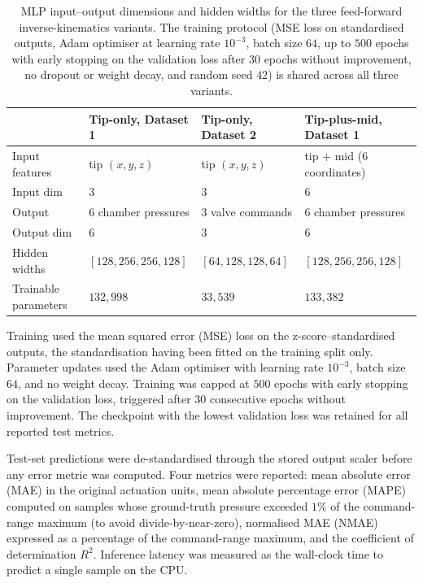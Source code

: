 \begin{table}[ht]
\centering
\caption[MLP configurations for the feed-forward inverse-kinematics variants.]{MLP input--output dimensions and hidden widths for the three feed-forward inverse-kinematics variants. The training protocol (MSE loss on standardised outputs, Adam optimiser at learning rate $10^{-3}$, batch size $64$, up to $500$ epochs with early stopping on the validation loss after $30$ epochs without improvement, no dropout or weight decay, and random seed $42$) is shared across all three variants.}
\label{tab:mlp_config}
\begin{tabularx}{\linewidth}{@{}l X X X@{}}
\toprule
                 & Tip-only, Dataset 1          & Tip-only, Dataset 2        & Tip-plus-mid, Dataset 1       \\
\midrule
Input features   & tip $(x, y, z)$              & tip $(x, y, z)$            & tip + mid ($6$ coordinates)   \\
Input dim        & 3                            & 3                          & 6                             \\
Output           & 6 chamber pressures          & 3 valve commands           & 6 chamber pressures           \\
Output dim       & 6                            & 3                          & 6                             \\
Hidden widths    & $[128, 256, 256, 128]$       & $[64, 128, 128, 64]$       & $[128, 256, 256, 128]$        \\
Trainable parameters & $132{,}998$              & $33{,}539$                 & $133{,}382$                   \\
\bottomrule
\end{tabularx}
\end{table}

Training used the mean squared error (MSE) loss on the z-score--standardised outputs, the standardisation having been fitted on the training split only. Parameter updates used the Adam optimiser with learning rate $10^{-3}$, batch size $64$, and no weight decay. Training was capped at $500$ epochs with early stopping on the validation loss, triggered after $30$ consecutive epochs without improvement. The checkpoint with the lowest validation loss was retained for all reported test metrics.

Test-set predictions were de-standardised through the stored output scaler before any error metric was computed. Four metrics were reported: mean absolute error (MAE) in the original actuation units, mean absolute percentage error (MAPE) computed on samples whose ground-truth pressure exceeded $1\%$ of the command-range maximum (to avoid divide-by-near-zero), normalised MAE (NMAE) expressed as a percentage of the command-range maximum, and the coefficient of determination $R^{2}$. Inference latency was measured as the wall-clock time to predict a single sample on the CPU.

